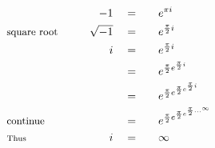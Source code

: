 \begin{alignat*}{5}
&\,&-1\quad&=\quad&&e^{\pi i}\\
&\small{\text{square root}}\qquad&\sqrt{-1}\quad&=&&e^{\frac{\pi}{2}i}\\
&\,&i\quad&=&&e^{\frac{\pi}{2}i}\\
&\,&\,&=&&e^{\frac{\pi}{2}e^{\frac{\pi}{2}i}}\\
&\,&\,&=&&e^{\frac{\pi}{2}e^{\frac{\pi}{2}e^{\frac{\pi}{2}i}}}\\
&\small{\text{continue}}&\,&=&&e^{\frac{\pi}{2}e^{\frac{\pi}{2}e^{\frac{\pi}{2}\ldots^{\infty}}}}\\
&\scriptstyle{\text{Thus}}&i\quad&=&&\infty
\end{alignat*}

